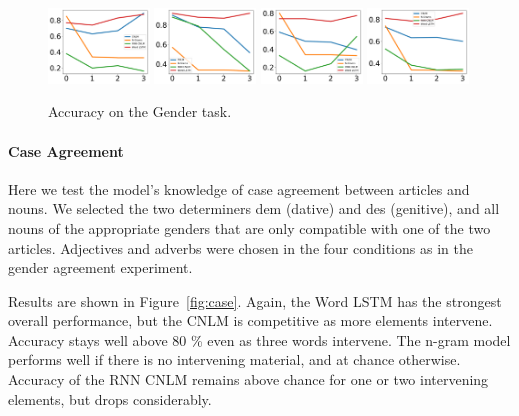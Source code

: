 \begin{figure}
\includegraphics[width=0.24\textwidth]{figures/german-gender-m.pdf}
\includegraphics[width=0.24\textwidth]{figures/german-gender-f.pdf}
\includegraphics[width=0.24\textwidth]{figures/german-gender-n.pdf}
\includegraphics[width=0.24\textwidth]{figures/german-gender-total.pdf}
\caption{Accuracy on the Gender task.}\label{fig:gender}
\end{figure}


\paragraph{Case Agreement}
Here we test the model's knowledge of case agreement between articles and nouns.
We selected the two determiners dem (dative) and des (genitive), and all nouns  of the appropriate genders that are only compatible with one of the two articles.
Adjectives and adverbs were chosen in the four conditions as in the gender agreement experiment.

Results are shown in Figure~\ref{fig:case}.
Again, the Word LSTM has the strongest overall performance, but the CNLM is competitive as more elements intervene. Accuracy stays well above 80 \% even as three words intervene.
The n-gram model performs well if there is no intervening material, and at chance otherwise.
Accuracy of the RNN CNLM remains above chance for one or two intervening elements, but drops considerably.

